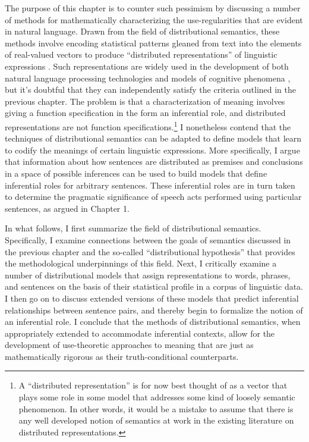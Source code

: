 The purpose of this chapter is to counter such pessimism by discussing a number of methods for mathematically characterizing the use-regularities that are evident in natural language. Drawn from the field of distributional semantics, these methods involve encoding statistical patterns gleaned from text into the elements of real-valued vectors to produce ``distributed representations'' of linguistic expressions \citep{TurneyPantel:2010,LandauerDumais:1997,Baroni:2014,Sahlgren:2005}. Such representations are widely used in the development of both natural language processing technologies and models of cognitive phenomena \citep{Manning:2015, LandauerDumais:1997,TurneyPantel:2010,Baroni:2014,JonesMewhort:2007,Fishbein:2008,Carrillo:2009}, but it's doubtful that they can independently satisfy the criteria outlined in the previous chapter. The problem is that a characterization of meaning involves giving a function specification in the form an inferential role, and distributed representations are not function specifications.\footnote{A ``distributed representation'' is for now best thought of as a vector that plays some role in some model that addresses some kind of loosely semantic phenomenon. In other words, it would be a mistake to assume that there is any well developed notion of semantics at work in the existing literature on distributed representations.} I nonetheless contend that the techniques of distributional semantics can be adapted to define models that learn to codify the meanings of certain linguistic expressions. More specifically, I argue that information about how sentences are distributed as premises and conclusions in a space of possible inferences can be used to build models that define inferential roles for arbitrary sentences. These inferential roles are in turn taken to determine the pragmatic significance of speech acts performed using particular sentences, as argued in Chapter 1.

In what follows, I first summarize the field of distributional semantics. Specifically, I examine connections between the goals of semantics discussed in the previous chapter and the so-called ``distributional hypothesis'' that provides the methodological underpinnings of this field. Next, I critically examine a number of distributional models that assign representations to words, phrases, and sentences on the basis of their statistical profile in a corpus of linguistic data. I then go on to discuss extended versions of these models that predict inferential relationships between sentence pairs, and thereby begin to formalize the notion of an inferential role. I conclude that the methods of distributional semantics, when appropriately extended to accommodate inferential contexts, allow for the development of use-theoretic approaches to meaning that are just as mathematically rigorous as their truth-conditional counterparts. 

